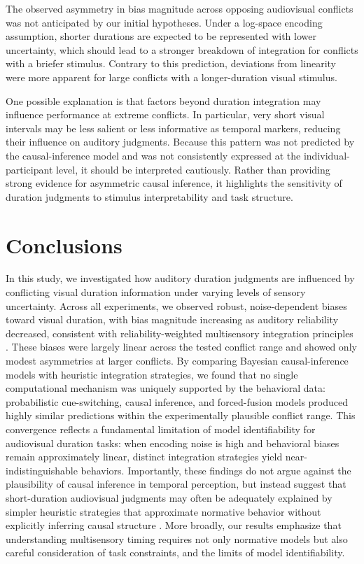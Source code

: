 \documentclass{biorxiv}
\providecommand{\citep}[1]{\cite{#1}}
\begin{document}
The observed asymmetry in bias magnitude across opposing audiovisual conflicts was not anticipated by our initial hypotheses. Under a log-space encoding assumption, shorter durations are expected to be represented with lower uncertainty, which should lead to a stronger breakdown of integration for conflicts with a briefer stimulus. Contrary to this prediction, deviations from linearity were more apparent for large conflicts with a longer-duration visual stimulus.

One possible explanation is that factors beyond duration integration may influence performance at extreme conflicts. In particular, very short visual intervals may be less salient or less informative as temporal markers, reducing their influence on auditory judgments. Because this pattern was not predicted by the causal-inference model and was not consistently expressed at the individual-participant level, it should be interpreted cautiously. Rather than providing strong evidence for asymmetric causal inference, it highlights the sensitivity of duration judgments to stimulus interpretability and task structure.

\section{Conclusions}

In this study, we investigated how auditory duration judgments are influenced by conflicting visual duration information under varying levels of sensory uncertainty. Across all experiments, we observed robust, noise-dependent biases toward visual duration, with bias magnitude increasing as auditory reliability decreased, consistent with reliability-weighted multisensory integration principles \citep{ernst2002humans,van2008distortions,hartcher2014duration}. These biases were largely linear across the tested conflict range and showed only modest asymmetries at larger conflicts. By comparing Bayesian causal-inference models with heuristic integration strategies, we found that no single computational mechanism was uniquely supported by the behavioral data: probabilistic cue-switching, causal inference, and forced-fusion models produced highly similar predictions within the experimentally plausible conflict range. This convergence reflects a fundamental limitation of model identifiability for audiovisual duration tasks: when encoding noise is high and behavioral biases remain approximately linear, distinct integration strategies yield near-indistinguishable behaviors. Importantly, these findings do not argue against the plausibility of causal inference in temporal perception, but instead suggest that short-duration audiovisual judgments may often be adequately explained by simpler heuristic strategies that approximate normative behavior without explicitly inferring causal structure \citep{caruso2018single,laquitaine2018switching,ni2024computational}. More broadly, our results emphasize that understanding multisensory timing requires not only normative models but also careful consideration of task constraints, and the limits of model identifiability.
\end{document}
